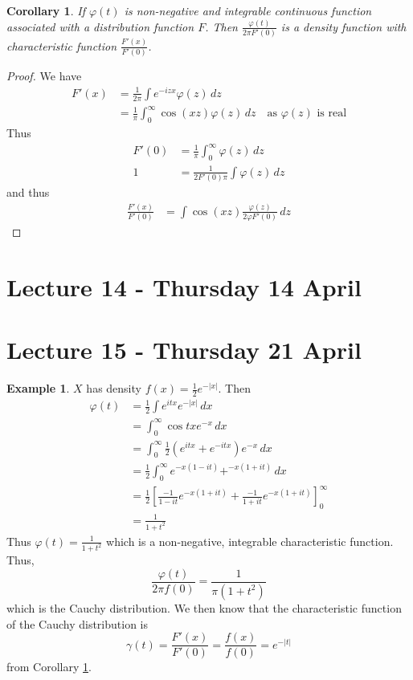 \documentclass[10pt, oneside, reqno]{amsart}
\theoremstyle{plain}%
\newtheorem{cor}[thm]{Corollary}
\theoremstyle{definition}
\newtheorem{exmp}[thm]{Example}
\theoremstyle{remark}
\renewcommand{\phi}{\varphi}
\begin{document}
\begin{cor}\label{cor:duality}
	If $\phi(t)$ is non-negative and integrable continuous function associated with a distribution function $F$.  Then $\frac{\phi(t)}{2 \pi F'(0)}$ is a density function with characteristic function $\frac{F'(x)}{F'(0)}$.
\end{cor}

\begin{proof}
	We have \begin{align*}
		F'(x) 	&= \frac{1}{2\pi} \int e^{-izx} \phi(z) \, dz \\
				&= \frac{1}{\pi} \int_0^\infty \cos(xz) \phi(z) \, dz \quad \text{as $\phi(z)$ is real}			\end{align*}
	Thus \begin{align*}
		F'(0)	&= \frac{1}{\pi} \int_0^\infty \phi(z) \, dz  \\
		1		&= \frac{1}{2 F'(0) \pi} \int \phi(z) \, dz 
	\end{align*}
	and thus 
	\begin{align*}
		\frac{F'(x)}{F'(0)} &= \int \cos(xz) \frac{\phi(z)}{2 \phi F'(0)} \, dz
	\end{align*}
\end{proof}
\section{Lecture 14 - Thursday 14 April} %
\label{sec:lecture_14_thursday_14_april}


\section{Lecture 15 - Thursday 21 April} %
\label{sec:lecture_15_thursday_21_april}
\begin{exmp}
	$X$ has density $f(x) = \frac{1}{2} e^{-|x|}$.  Then \begin{align*}
		\phi(t) &= \frac{1}{2} \int e^{itx} e^{-|x|} \, dx \\
		&= \int_0^\infty \cos tx e^{-x} \, dx \\
		&= \int_0^\infty \frac{1}{2} \left( e^{itx} + e^{-itx} \right) e^{-x} \, dx \\
		&= \frac{1}{2} \int_0^\infty e^{-x(1-it)} + ^{-x(1 +it)} \, dx \\
		&= \frac{1}{2} \left[ \frac{-1}{1-it}e^{-x(1+it)} + \frac{-1}{1+it}e^{-x(1+it)} \right]_0^\infty \\
		&= \frac{1}{1+t^2}
	\end{align*}  Thus $\phi(t) = \frac{1}{1+t^2}$ which is a non-negative, integrable characteristic function.  Thus, \[
		\frac{\phi(t)}{2\pi f(0)} = \frac{1}{\pi(1+t^2)} 
	\] which is the Cauchy distribution.  We then know that the characteristic function of the Cauchy distribution is \[
		\gamma(t) = \frac{F'(x)}{F'(0)} = \frac{f(x)}{f(0)} = e^{-|t|}
	\] from Corollary \ref{cor:duality}.
\end{exmp}
\end{document}
